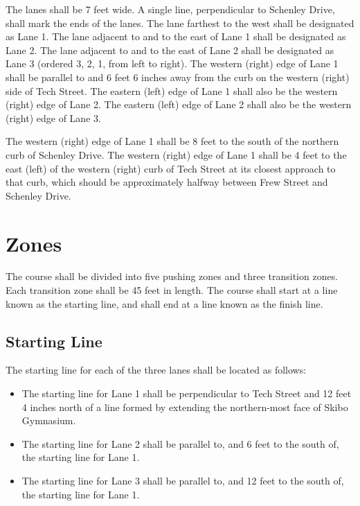	The lanes shall be 7 feet wide. A single line, perpendicular to Schenley Drive,
	shall mark the ends of the lanes. The lane farthest to the west shall be
	designated as Lane 1. The lane adjacent to and to the east of Lane 1 shall be
	designated as Lane 2. The lane adjacent to and to the east of Lane 2 shall be
	designated as Lane 3 (ordered 3, 2, 1, from left to right). The western (right)
	edge of Lane 1 shall be parallel to and 6 feet 6 inches away from the curb on
	the western (right) side of Tech Street. The eastern (left) edge of Lane 1
	shall also be the western (right) edge of Lane 2. The eastern (left) edge of
	Lane 2 shall also be the western (right) edge of Lane 3.

	The western (right) edge of Lane 1 shall be 8 feet to the south of the northern
	curb of Schenley Drive. The western (right) edge of Lane 1 shall be 4 feet to
	the east (left) of the western (right) curb of Tech Street at its closest
	approach to that curb, which should be approximately halfway between Frew
	Street and Schenley Drive.

\section{Zones}

	The course shall be divided into five pushing zones and three transition zones.
	Each transition zone shall be 45 feet in length. The course shall start at a
	line known as the starting line, and shall end at a line known as the finish
	line.

\subsection{Starting Line}

	The starting line for each of the three lanes shall be located as follows:

	\begin{itemize}
		
		\item
		The starting line for Lane 1 shall be perpendicular to Tech Street and 12 feet
		4 inches north of a line formed by extending the northern-most face of Skibo
		Gymnasium.

		\item
		The starting line for Lane 2 shall be parallel to, and 6 feet to the south of,
		the starting line for Lane 1.

		\item
		The starting line for Lane 3 shall be parallel to, and 12 feet to the south of,
		the starting line for Lane 1.

	\end{itemize}

